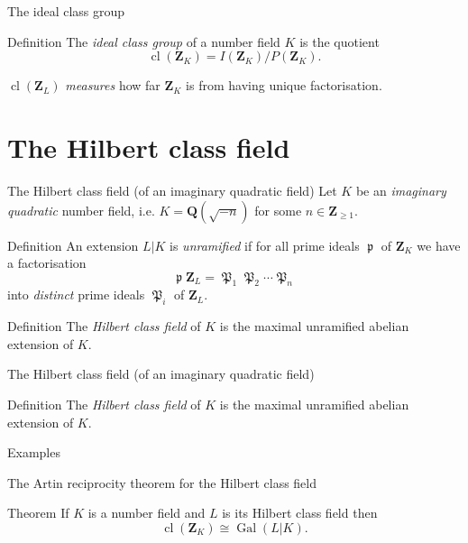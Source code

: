 \documentclass{beamer}
\DeclareMathOperator{\Gal}{Gal}
\DeclareMathOperator{\cl}{cl}
\DeclareMathOperator{\p}{\mathfrak{p}}
\DeclareMathOperator{\pp}{\mathfrak{P}}
\begin{document}
\begin{frame}{The ideal class group}

\begin{block}{Definition}
The \emph{ideal class group} of a number field $K$ is the quotient
\[
\cl(\mathbf{Z}_K) = I(\mathbf{Z}_K)/P(\mathbf{Z}_K).
\]
\end{block}
\pause
$\cl(\mathbf{Z}_L)$ \emph{measures} how far $\mathbf{Z}_K$ is from having unique factorisation.
\end{frame}

\section{The Hilbert class field}
\begin{frame}{The Hilbert class field (of an imaginary quadratic field)}
Let $K$ be an \emph{imaginary quadratic} number field, i.e. $K = \mathbf{Q}(\sqrt{-n})$ for some $n \in \mathbf{Z}_{\ge 1}$.
\pause
\begin{block}{Definition}
An extension $L|K$ is \emph{unramified} if for all prime ideals $\p$ of $\mathbf{Z}_K$ we have a factorisation
\[
\p\mathbf{Z}_L = \pp_1\pp_2\cdots \pp_n
\]
into \emph{distinct} prime ideals $\pp_i$ of $\mathbf{Z}_L$.
\end{block}
\pause
\begin{block}{Definition}
The \emph{Hilbert class field} of $K$ is the maximal unramified abelian extension of $K$.
\end{block}
\end{frame}

\begin{frame}{The Hilbert class field (of an imaginary quadratic field)}
\begin{block}{Definition}
The \emph{Hilbert class field} of $K$ is the maximal unramified abelian extension of $K$.
\end{block}
\begin{block}{Examples}
\end{block}
\end{frame}

\begin{frame}{The Artin reciprocity theorem for the Hilbert class field}
\begin{block}{Theorem}
If $K$ is a number field and $L$ is its Hilbert class field then
\[
\cl(\mathbf{Z}_K) \cong \Gal(L|K).
\]
\end{block}
\end{frame}
\end{document}
